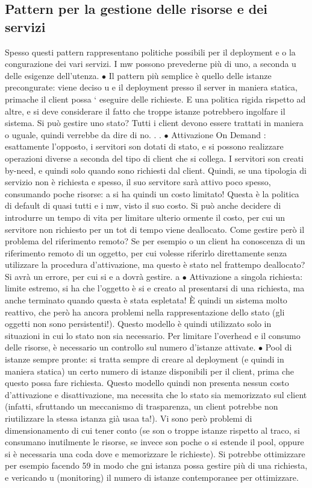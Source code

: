 \subsection{Pattern per la gestione delle risorse e dei servizi}
Spesso questi pattern rappresentano politiche possibili per il deployment e o la
congurazione dei vari servizi. I mw possono prevederne più di uno, a seconda
u
delle esigenze dell'utenza.
$\bullet$ Il pattern più semplice è quello delle istanze precongurate: viene deciso
u
e
il deployment presso il server in maniera statica, primache il client possa
`
eseguire delle richieste. E una politica rigida rispetto ad altre, e si deve
considerare il fatto che troppe istanze potrebbero ingolfare il sistema. Si
può gestire uno stato? Tutti i client devono essere trattati in maniera
o
uguale, quindi verrebbe da dire di no. . .
$\bullet$ Attivazione On Demand : esattamente l'opposto, i servitori son dotati di
stato, e si possono realizzare operazioni diverse a seconda del tipo di client
che si collega. I servitori son creati by-need, e quindi solo quando sono
richiesti dal client. Quindi, se una tipologia di servizio non è richiesta
e
spesso, il suo servitore sarà attivo poco spesso, consumando poche risorse:
a
si ha quindi un costo limitato! Questa è la politica di default di quasi tutti
e
i mw, visto il suo costo.
Si può anche decidere di introdurre un tempo di vita per limitare ulterio
ormente il costo, per cui un servitore non richiesto per un tot di tempo
viene deallocato.
Come gestire però il problema del riferimento remoto? Se per esempio
o
un client ha conoscenza di un riferimento remoto di un oggetto, per cui
volesse riferirlo direttamente senza utilizzare la procedura d'attivazione,
ma questo è stato nel frattempo deallocato? Si avrà un errore, per cui si
e
a
dovrà gestire.
a
$\bullet$ Attivazione a singola richiesta: limite estremo, si ha che l'oggetto è si
e
creato al presentarsi di una richiesta, ma anche terminato quando questa è stata espletata! È quindi un sistema molto
reattivo, che però ha ancora problemi nella rappresentazione dello stato (gli oggetti non sono persistenti!). Questo
modello è quindi utilizzato solo in situazioni in cui lo stato non sia necessario. Per limitare l'overhead e il consumo
delle risorse, è necessario un controllo sul numero d'istanze attivate.
$\bullet$ Pool di istanze sempre pronte: si tratta sempre di creare al deployment
(e quindi in maniera statica) un certo numero di istanze disponibili per
il client, prima che questo possa fare richiesta. Questo modello quindi
non presenta nessun costo d'attivazione e disattivazione, ma necessita che
lo stato sia memorizzato sul client (infatti, sfruttando un meccanismo di
trasparenza, un client potrebbe non riutilizzare la stessa istanza già usaa
ta!). Vi sono però problemi di dimensionamento di cui tener conto (se son
o
troppe istanze rispetto al traco, si consumano inutilmente le risorse, se
invece son poche o si estende il pool, oppure si è necessaria una coda dove
e
memorizzare le richieste). Si potrebbe ottimizzare per esempio facendo
59
in modo che gni istanza possa gestire più di una richiesta, e vericando
u
(monitoring) il numero di istanze contemporanee per ottimizzare.

